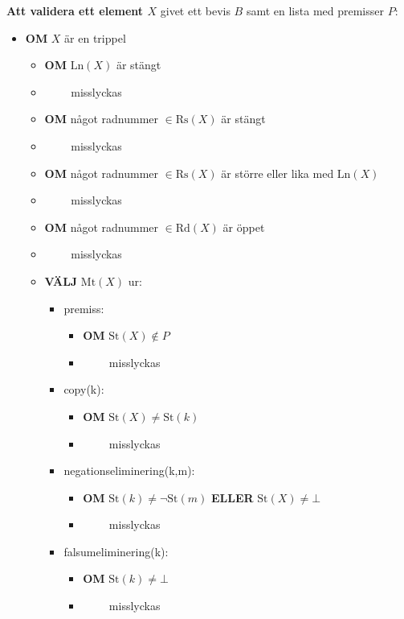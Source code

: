 \documentclass[a4paper,10.5pt]{article}
\newcommand{\Ln}[1]{\mathrm{Ln}(#1)}
\newcommand{\St}[1]{\mathrm{St}(#1)}
\newcommand{\Mt}[1]{\mathrm{Mt}(#1)}
\newcommand{\Rs}[1]{\mathrm{Rs}(#1)}
\newcommand{\Rd}[1]{\mathrm{Rd}(#1)}
\begin{document}
\bigskip
\noindent
\textbf{Att validera ett element $X$} givet ett bevis $B$ samt en lista med premisser $P$:
\begin{itemize}
\item[] \textbf{OM} $X$ är en trippel
    \begin{itemize}
    \item[] \textbf{OM} $\Ln{X}$ är stängt
    \item[] $\qquad$ misslyckas
    \item[] \textbf{OM} något radnummer $\in \Rs{X}$ är stängt
    \item[] $\qquad$ misslyckas
    \item[] \textbf{OM} något radnummer $\in \Rs{X}$ är större eller lika med $\Ln{X}$
    \item[] $\qquad$ misslyckas
    \item[] \textbf{OM} något radnummer $\in \Rd{X}$ är öppet
    \item[] $\qquad$ misslyckas
    \item[] \textbf{VÄLJ} $\Mt{X}$ ur:
        \begin{itemize}
        \item[] premiss:
            \begin{itemize}
            \item[] \textbf{OM} $\St{X} \notin P$
            \item[] $\qquad$ misslyckas
            \end{itemize}
        \item[] copy(k):
            \begin{itemize}
            \item[] \textbf{OM} $\St{X} \neq \St{k}$
            \item[] $\qquad$ misslyckas
            \end{itemize}
        \item[] negationseliminering(k,m):
            \begin{itemize}
            \item[] \textbf{OM} $\St{k} \neq \lnot \St{m}$ \textbf{ELLER} $\St{X} \neq \bot$
            \item[] $\qquad$ misslyckas
            \end{itemize}
        \item[] falsumeliminering(k):
            \begin{itemize}
            \item[] \textbf{OM} $\St{k} \neq \bot$
            \item[] $\qquad$ misslyckas

\end{itemize}
\end{itemize}
\end{itemize}
\end{itemize}
\end{document}
